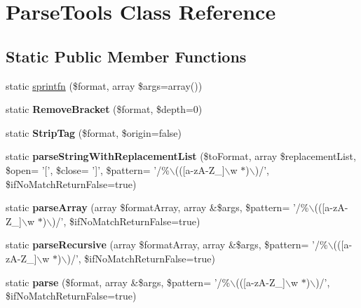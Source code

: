\hypertarget{class_tools_1_1_parse_tools}{
\section{\-Parse\-Tools \-Class \-Reference}
\label{class_tools_1_1_parse_tools}
}
\subsection*{\-Static \-Public \-Member \-Functions}
\begin{DoxyCompactItemize}
\item 
static \hyperlink{class_tools_1_1_parse_tools_a65dc2d63bc4580c9771d78dbf69be7e6}{sprintfn} (\$format, array \$args=array())
\item 
\hypertarget{class_tools_1_1_parse_tools_aeeda97b4e58dcc36d7a825ac8119f5cf}{
static {\bfseries \-Remove\-Bracket} (\$format, \$depth=0)}
\label{class_tools_1_1_parse_tools_aeeda97b4e58dcc36d7a825ac8119f5cf}

\item 
\hypertarget{class_tools_1_1_parse_tools_a0dbf596a1a7d621303910236249d129e}{
static {\bfseries \-Strip\-Tag} (\$format, \$origin=false)}
\label{class_tools_1_1_parse_tools_a0dbf596a1a7d621303910236249d129e}

\item 
\hypertarget{class_tools_1_1_parse_tools_a65117a38ed1eb33b1da79cd5d671ecd3}{
static {\bfseries parse\-String\-With\-Replacement\-List} (\$to\-Format, array \$replacement\-List, \$open= '\mbox{[}', \$close= '\mbox{]}', \$pattern= '/\%$\backslash$((\mbox{[}a-\/z\-A-\/\-Z\-\_\-\mbox{]}$\backslash$w $\ast$)$\backslash$)/', \$if\-No\-Match\-Return\-False=true)}
\label{class_tools_1_1_parse_tools_a65117a38ed1eb33b1da79cd5d671ecd3}

\item 
\hypertarget{class_tools_1_1_parse_tools_aec486908abdd23eeccac95e4a1454a94}{
static {\bfseries parse\-Array} (array \$format\-Array, array \&\$args, \$pattern= '/\%$\backslash$((\mbox{[}a-\/z\-A-\/\-Z\-\_\-\mbox{]}$\backslash$w $\ast$)$\backslash$)/', \$if\-No\-Match\-Return\-False=true)}
\label{class_tools_1_1_parse_tools_aec486908abdd23eeccac95e4a1454a94}

\item 
\hypertarget{class_tools_1_1_parse_tools_a59dfb76e4f4fcc1c9cd05a63c8f7767e}{
static {\bfseries parse\-Recursive} (array \$format\-Array, array \&\$args, \$pattern= '/\%$\backslash$((\mbox{[}a-\/z\-A-\/\-Z\-\_\-\mbox{]}$\backslash$w $\ast$)$\backslash$)/', \$if\-No\-Match\-Return\-False=true)}
\label{class_tools_1_1_parse_tools_a59dfb76e4f4fcc1c9cd05a63c8f7767e}

\item 
\hypertarget{class_tools_1_1_parse_tools_a439d5819f4798f7626033af3b9dd4139}{
static {\bfseries parse} (\$format, array \&\$args, \$pattern= '/\%$\backslash$((\mbox{[}a-\/z\-A-\/\-Z\-\_\-\mbox{]}$\backslash$w $\ast$)$\backslash$)/', \$if\-No\-Match\-Return\-False=true)}
\label{class_tools_1_1_parse_tools_a439d5819f4798f7626033af3b9dd4139}

\end{DoxyCompactItemize}


